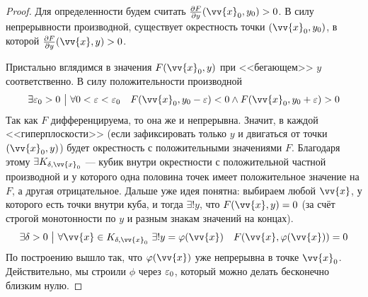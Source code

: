 \begin{proof}
	Для определенности будем считать $\pd{F}{y} (\vv{x}_0, y_0) > 0$. В силу непрерывности производной, существует окрестность точки $(\vv{x}_0, y_0)$, в которой $\pd{F}{y}(\vv{x}, y) > 0$.
	
	Пристально вглядимся в значения $F(\vv{x}_0, y)$ при <<бегающем>> $y$ соответственно. В силу положительности производной
	\[
		\exists \eps_0 > 0 \such \forall 0 < \eps < \eps_0 \quad F(\vv{x}_0, y_0 - \eps) < 0 \wedge F(\vv{x}_0, y_0 + \eps) > 0
	\]
	Так как $F$ дифференцируема, то она же и непрерывна. Значит, в каждой <<гиперплоскости>> (если зафиксировать только $y$ и двигаться от точки $(\vv{x}_0, y)$) будет окрестность с положительными значениями $F$. Благодаря этому $\exists K_{\delta, \vv{x}_0}$ --- кубик внутри окрестности с положительной частной производной и у которого одна половина точек имеет положительное значение на $F$, а другая отрицательное. Дальше уже идея понятна: выбираем любой $\vv{x}$, у которого есть точки внутри куба, и тогда $\exists ! y$, что $F(\vv{x}, y) = 0$ (за счёт строгой монотонности по $y$ и разным знакам значений на концах).
	\[
		\exists \delta > 0 \such \forall \vv{x} \in K_{\delta, \vv{x}_0}\ \exists ! y = \phi(\vv{x}) \quad F(\vv{x}, \phi(\vv{x})) = 0
	\]
	По построению вышло так, что $\phi(\vv{x})$ уже непрерывна в точке $\vv{x}_0$. Действительно, мы строили $\phi$ через $\varepsilon_0$, который можно делать бесконечно близким нулю.
	

\end{proof}
